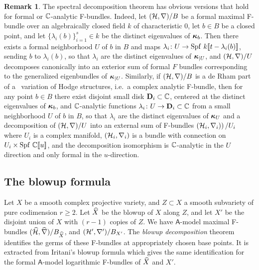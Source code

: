 \documentclass[twoside,leqno]{article}
\numberwithin{equation}{section}
\theoremstyle{plain}
\theoremstyle{definition}
\newtheorem{remark}[equation]{Remark}
\begin{document}
\begin{remark} \label{rem:Can.and.formal.decomp}
The spectral decomposition theorem has obvious versions that hold for 
formal or \linebreak $\mathbb C$-analytic F-bundles. Indeed, let $(\mathcal H, \nabla)/B$ be a formal maximal F-bundle over an algebraically closed  field $k$ of characteristic $0$, let $b \in B$ be a closed point, and let 
$\{\lambda_{i}(b)\}_{i=1}^{s} \in k$ be the distinct eigenvalues of $\boldsymbol{\kappa}_{b}$. Then there exists a formal neighborhood $U$ of $b$ in $B$ and maps $\lambda_{i} \colon U \to \operatorname{Spf} \, k[\![t-\lambda_{i}(b)]\!]$, sending $b$ to $\lambda_{i}(b)$, so that $\lambda_{i}$ are the distinct eigenvalues of $\boldsymbol{\kappa}_{|U}$, and $(\mathcal H,\nabla)/U$ decomposes canonically into an exterior sum of formal $F$ bundles corresponding to the generalized eigenbundles of $\boldsymbol{\kappa}_{|U}$. Similarly, if $(\mathcal H, \nabla)/B$ is a de Rham part of a \nc \ variation of Hodge structures, i.e.\ a complex analytic F-bundle, then for any point $b \in B$ there exist disjoint small disk $\mathbf{D}_{i} \subset \mathbb C$, centered at the distinct eigenvalues of $\boldsymbol{\kappa}_{b}$, and $\mathbb C$-analytic functions $\lambda_{i} \colon U \to \mathbf{D}_{i} \subset \mathbb C$ from a small neighborhood $U$ of $b$ in $B$, so that $\lambda_{i}$ are the distinct  eigenvalues of $\boldsymbol{\kappa}_{U}$ and a decomposition of $(\mathcal H,\nabla)/U$ into an external sum of F-bundles $\left(\mathcal H_{i},\nabla_{i})\right)/U_{i}$ where $U_{i}$ is a complex manifold, $(\mathcal H_{i},\nabla_{i})$ is a bundle with connection on $U_{i}\times \operatorname{Spf} \, \mathbb C[\![u]\!]$, and the decomposition isomorphism is $\mathbb C$-analytic in the $U$ direction and only formal in the $u$-direction.
\end{remark}

\subsection{The blowup formula} \label{sec:blowup}

Let $X$ be a smooth complex projective variety, and $Z \subset X$ a smooth subvariety of pure codimension $r \ge 2$. Let $\widehat{X}$ be the blowup of $X$ along $Z$, and let $X'$ be the disjoint union of $X$ with $(r-1)$ copies of $Z$.
We have $\mathsf{A}$-model maximal F-bundles $(\widehat{\mathcal H}, \widehat{\nabla})/B_{\widehat{X}}$, and $(\mathcal H', \nabla')/B_{X'}$. The \emph{blowup decomposition} theorem identifies  the germs of these F-bundles at appropriately chosen base  points. It is extracted from Iritani's blowup formula \cite{Iritani_blowup} which gives the same identification for the formal $\mathsf{A}$-model logarithmic F-bundles of $\widehat{X}$ and $X'$.
\end{document}
